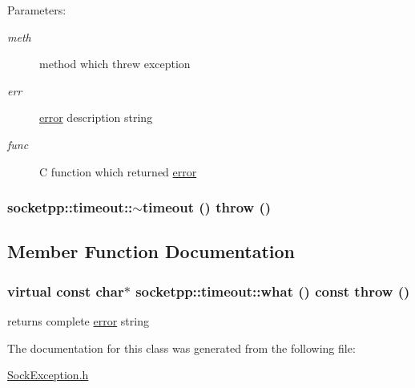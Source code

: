 \begin{Desc}
\item[Parameters:]
\begin{description}
\item[{\em meth}]method which threw exception \item[{\em err}]\hyperlink{classsocketpp_1_1error}{error} description string \item[{\em func}]C function which returned \hyperlink{classsocketpp_1_1error}{error} \end{description}
\end{Desc}
\hypertarget{classsocketpp_1_1timeout_8593bc6e69d1f62e41332e4b3809b3e7}{
\subsubsection[{$\sim$timeout}]{\setlength{\rightskip}{0pt plus 5cm}socketpp::timeout::$\sim$timeout ()  throw ()}}
\label{classsocketpp_1_1timeout_8593bc6e69d1f62e41332e4b3809b3e7}




\subsection{Member Function Documentation}
\hypertarget{classsocketpp_1_1timeout_4ec44590b052339b206a94afbcba6ffb}{
\subsubsection[{what}]{\setlength{\rightskip}{0pt plus 5cm}virtual const char$\ast$ socketpp::timeout::what () const  throw ()}}
\label{classsocketpp_1_1timeout_4ec44590b052339b206a94afbcba6ffb}


returns complete \hyperlink{classsocketpp_1_1error}{error} string 



The documentation for this class was generated from the following file:\begin{CompactItemize}
\item 
\hyperlink{SockException_8h}{SockException.h}\end{CompactItemize}
